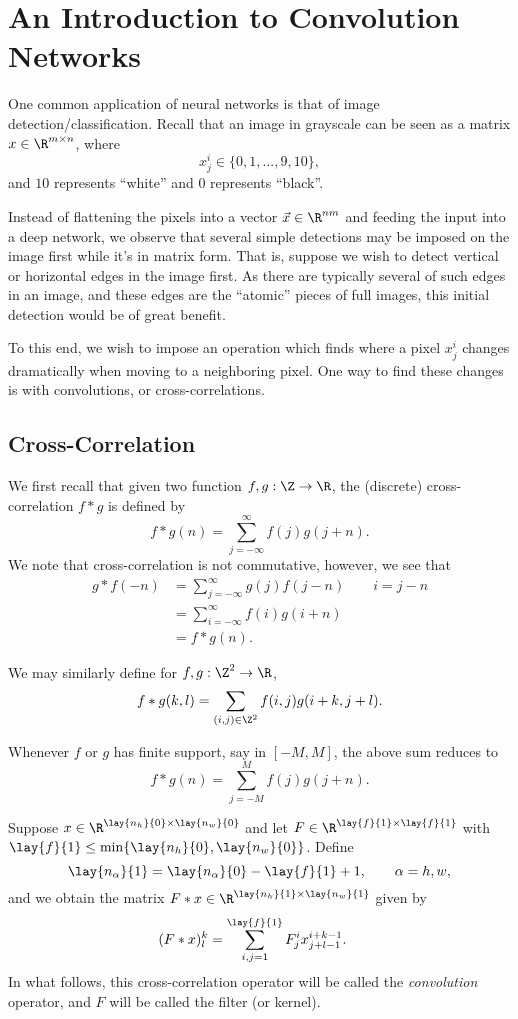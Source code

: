

\section{An Introduction to Convolution Networks}

One common application of neural networks is that of image detection/classification.  Recall that an image in grayscale can be seen as a matrix $x\in\R^{m\times n}$, where
$$x^i_j\in\{0,1,...,9,10\},$$
and $10$ represents ``white'' and $0$ represents ``black''.

Instead of flattening the pixels into a vector $\vec{x}\in\R^{nm}$ and feeding the input into a deep network, we observe that several simple detections may be imposed on the image first while it's in matrix form.  That is, suppose we wish to detect vertical or horizontal edges in the image first.  As there are typically several of such edges in an image, and these edges are the ``atomic'' pieces of full images, this initial detection would be of great benefit.

To this end, we wish to impose an operation which finds where a pixel $x^i_j$ changes dramatically when moving to a neighboring pixel.  One way to find these changes is with convolutions, or cross-correlations.


\subsection{Cross-Correlation}

We first recall that given two function $f,g:\Z\to\R$, the (discrete) cross-correlation $f*g$ is defined by
$$f*g(n)=\sum_{j=-\infty}^\infty f(j)g(j+n).$$
We note that cross-correlation is not commutative, however, we see that
\begin{align*}
	g*f(-n)&=\sum_{j=-\infty}^\infty g(j)f(j-n)\qquad i=j-n\\
	&=\sum_{i=-\infty}^\infty f(i)g(i+n)\\
	&=f*g(n).
\end{align*}

We may similarly define for $f,g:\Z^2\to\R$,
$$f*g(k,l)=\sum_{(i,j)\in\Z^2}f(i,j)g(i+k,j+l).$$



Whenever $f$ or $g$ has finite support, say in $[-M,M]$, the above sum reduces to
$$f*g(n)=\sum_{j=-M}^Mf(j)g(j+n).$$


Suppose $x\in\R^{\lay{n_h}{0}\times \lay{n_w}{0}}$ and let $F\in\R^{\lay{f}{1}\times\lay{f}{1}}$ with $\lay{f}{1}\leq\min\{\lay{n_h}{0},\lay{n_w}{0}\}$.  Define
$$\lay{n_\alpha}{1}=\lay{n_\alpha}{0}-\lay{f}{1}+1,\qquad \alpha=h,w,$$
and we obtain the matrix $F*x\in\R^{\lay{n_h}{1}\times\lay{n_w}{1}}$ given by
\begin{align*}
	(F*x)^k_l&=\sum_{i,j=1}^{\lay{f}{1}}F^i_jx^{i+k-1}_{j+l-1}.
\end{align*}
In what follows, this cross-correlation operator will be called the \textit{convolution} operator, and $F$ will be called the filter (or kernel).

